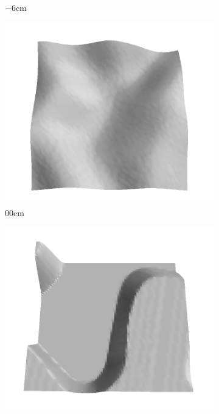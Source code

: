 \documentclass[../document.tex]{subfiles}
\begin{document}
\begin{figure}[htbp]
\begin{subfigure}[b]{0.19\textwidth}
    \caption{$-6$cm}
    \end{subfigure}
    \begin{subfigure}[b]{0.19\textwidth}
    \includegraphics[width=\linewidth]{../img/5/train/all/00-patch-3d-majavi-4.png}
    \caption{$00$cm}
    \end{subfigure}
    \begin{subfigure}[b]{0.19\textwidth}
    \includegraphics[width=\linewidth]{../img/5/train/all/01-patch-3d-majavi-5.png}

\end{subfigure}
\end{figure}
\end{document}
